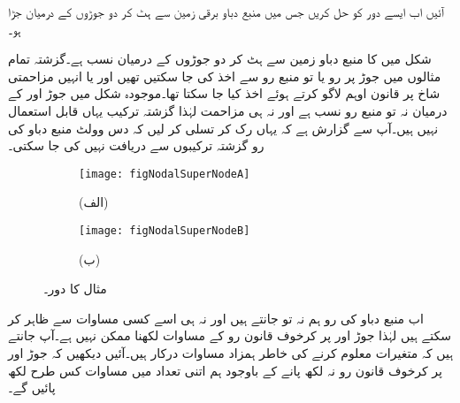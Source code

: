 
آئیں اب ایسے دور کو حل کریں جس میں منبع دباو برقی زمین سے ہٹ کر دو جوڑوں کے درمیان جڑا ہو۔

شکل  میں  کا منبع دباو زمین سے ہٹ کر دو جوڑوں کے درمیان نسب ہے۔گزشتہ تمام مثالوں میں جوڑ پر رو یا تو منبع رو سے اخذ کی جا سکتیں تھیں اور یا انہیں مزاحمتی شاخ پر قانون اوہم لاگو کرتے ہوئے اخذ کیا جا سکتا تھا۔موجودہ شکل میں جوڑ  اور  کے درمیان نہ تو منبع رو نسب ہے اور نہ ہی مزاحمت لہٰذا گزشتہ ترکیب یہاں قابل استعمال نہیں ہیں۔آپ سے گزارش ہے کہ یہاں رک کر تسلی کر لیں کہ دس وولٹ منبع دباو کی رو گزشتہ ترکیبوں سے دریافت نہیں کی جا سکتی۔ 
\begin{figure}
\centering
\begin{subfigure}{1\textwidth}
\centering
\texttt{[image: figNodalSuperNodeA]}
\caption*{(الف)}
\end{subfigure}
\begin{subfigure}{1\textwidth}
\centering
\texttt{[image: figNodalSuperNodeB]}
\caption*{(ب)}
\end{subfigure}
\caption{مثال  کا دور۔}
\label{شکل_مثال_جوڑ_غیر_تابع_منبع_دباو_دو_جوڑ_مابین}
\end{figure}

اب منبع دباو کی رو ہم نہ تو جانتے ہیں اور نہ ہی اسے کسی مساوات سے ظاہر کر سکتے ہیں لہٰذا جوڑ  اور  پر کرخوف قانون رو کے مساوات لکھنا ممکن نہیں ہے۔آپ جانتے ہیں کہ  متغیرات معلوم کرنے کی خاطر  ہمزاد مساوات درکار ہیں۔آئیں دیکھیں کہ  جوڑ  اور  پر کرخوف قانون رو نہ لکھ پانے کے باوجود ہم اتنی تعداد میں مساوات کس طرح  لکھ پائیں گے۔

